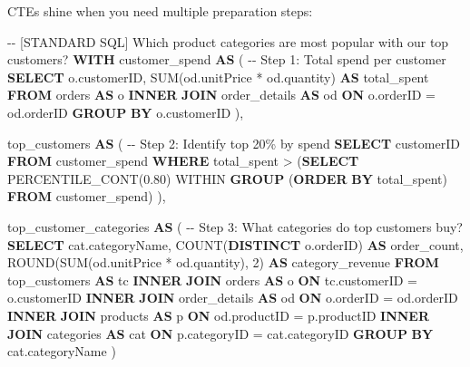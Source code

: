 \documentclass[
  letterpaper,
  DIV=11,
  numbers=noendperiod]{scrreprt}
\newenvironment{Shaded}{\begin{snugshade}}{\end{snugshade}}
\newcommand{\CommentTok}[1]{\textcolor[rgb]{0.37,0.37,0.37}{#1}}
\newcommand{\DecValTok}[1]{\textcolor[rgb]{0.68,0.00,0.00}{#1}}
\newcommand{\FloatTok}[1]{\textcolor[rgb]{0.68,0.00,0.00}{#1}}
\newcommand{\FunctionTok}[1]{\textcolor[rgb]{0.28,0.35,0.67}{#1}}
\newcommand{\KeywordTok}[1]{\textcolor[rgb]{0.00,0.23,0.31}{\textbf{#1}}}
\newcommand{\NormalTok}[1]{\textcolor[rgb]{0.00,0.23,0.31}{#1}}
\newcommand{\OperatorTok}[1]{\textcolor[rgb]{0.37,0.37,0.37}{#1}}
\begin{document}
CTEs shine when you need multiple preparation steps:

\begin{codelisting}

\caption{\texttt{duckdb}}

\begin{Shaded}
\begin{Highlighting}[]
\CommentTok{{-}{-} [STANDARD SQL] Which product categories are most popular with our top customers?}
\KeywordTok{WITH}\NormalTok{ customer\_spend }\KeywordTok{AS}\NormalTok{ (}
    \CommentTok{{-}{-} Step 1: Total spend per customer}
    \KeywordTok{SELECT}
\NormalTok{        o.customerID,}
        \FunctionTok{SUM}\NormalTok{(od.unitPrice }\OperatorTok{*}\NormalTok{ od.quantity) }\KeywordTok{AS}\NormalTok{ total\_spent}
    \KeywordTok{FROM}\NormalTok{ orders }\KeywordTok{AS}\NormalTok{ o}
    \KeywordTok{INNER} \KeywordTok{JOIN}\NormalTok{ order\_details }\KeywordTok{AS}\NormalTok{ od }\KeywordTok{ON}\NormalTok{ o.orderID }\OperatorTok{=}\NormalTok{ od.orderID}
    \KeywordTok{GROUP} \KeywordTok{BY}\NormalTok{ o.customerID}
\NormalTok{),}

\NormalTok{top\_customers }\KeywordTok{AS}\NormalTok{ (}
    \CommentTok{{-}{-} Step 2: Identify top 20\% by spend}
    \KeywordTok{SELECT}\NormalTok{ customerID}
    \KeywordTok{FROM}\NormalTok{ customer\_spend}
    \KeywordTok{WHERE}\NormalTok{ total\_spent }\OperatorTok{\textgreater{}}\NormalTok{ (}\KeywordTok{SELECT} \FunctionTok{PERCENTILE\_CONT}\NormalTok{(}\FloatTok{0.80}\NormalTok{) WITHIN }\KeywordTok{GROUP}\NormalTok{ (}\KeywordTok{ORDER} \KeywordTok{BY}\NormalTok{ total\_spent) }\KeywordTok{FROM}\NormalTok{ customer\_spend)}
\NormalTok{),}

\NormalTok{top\_customer\_categories }\KeywordTok{AS}\NormalTok{ (}
    \CommentTok{{-}{-} Step 3: What categories do top customers buy?}
    \KeywordTok{SELECT}
\NormalTok{        cat.categoryName,}
        \FunctionTok{COUNT}\NormalTok{(}\KeywordTok{DISTINCT}\NormalTok{ o.orderID) }\KeywordTok{AS}\NormalTok{ order\_count,}
        \FunctionTok{ROUND}\NormalTok{(}\FunctionTok{SUM}\NormalTok{(od.unitPrice }\OperatorTok{*}\NormalTok{ od.quantity), }\DecValTok{2}\NormalTok{) }\KeywordTok{AS}\NormalTok{ category\_revenue}
    \KeywordTok{FROM}\NormalTok{ top\_customers }\KeywordTok{AS}\NormalTok{ tc}
    \KeywordTok{INNER} \KeywordTok{JOIN}\NormalTok{ orders }\KeywordTok{AS}\NormalTok{ o }\KeywordTok{ON}\NormalTok{ tc.customerID }\OperatorTok{=}\NormalTok{ o.customerID}
    \KeywordTok{INNER} \KeywordTok{JOIN}\NormalTok{ order\_details }\KeywordTok{AS}\NormalTok{ od }\KeywordTok{ON}\NormalTok{ o.orderID }\OperatorTok{=}\NormalTok{ od.orderID}
    \KeywordTok{INNER} \KeywordTok{JOIN}\NormalTok{ products }\KeywordTok{AS}\NormalTok{ p }\KeywordTok{ON}\NormalTok{ od.productID }\OperatorTok{=}\NormalTok{ p.productID}
    \KeywordTok{INNER} \KeywordTok{JOIN}\NormalTok{ categories }\KeywordTok{AS}\NormalTok{ cat }\KeywordTok{ON}\NormalTok{ p.categoryID }\OperatorTok{=}\NormalTok{ cat.categoryID}
    \KeywordTok{GROUP} \KeywordTok{BY}\NormalTok{ cat.categoryName}
\NormalTok{)}


\end{Highlighting}
\end{Shaded}
\end{codelisting}
\end{document}
